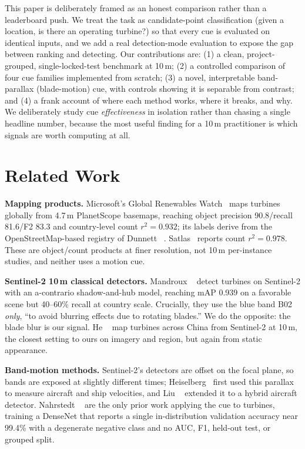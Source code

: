 \documentclass[10pt,twocolumn,letterpaper]{article}
\begin{document}
This paper is deliberately framed as an honest comparison rather than a leaderboard push. We treat the task as candidate-point classification (given a location, is there an operating turbine?) so that every cue is evaluated on identical inputs, and we add a real detection-mode evaluation to expose the gap between ranking and detecting. Our contributions are: (1) a clean, project-grouped, single-locked-test benchmark at 10\,m; (2) a controlled comparison of four cue families implemented from scratch; (3) a novel, interpretable band-parallax (blade-motion) cue, with controls showing it is separable from contrast; and (4) a frank account of where each method works, where it breaks, and why. We deliberately study cue \emph{effectiveness} in isolation rather than chasing a single headline number, because the most useful finding for a 10\,m practitioner is which signals are worth computing at all.

\section{Related Work}
\textbf{Mapping products.} Microsoft's Global Renewables Watch~\cite{grw} maps turbines globally from 4.7\,m PlanetScope basemaps, reaching object precision 90.8/recall 81.6/F2 83.3 and country-level count $r^2{=}0.932$; its labels derive from the OpenStreetMap-based registry of Dunnett \etal~\cite{dunnett}. Satlas~\cite{satlas} reports count $r^2{=}0.978$. These are object/count products at finer resolution, not 10\,m per-instance studies, and neither uses a motion cue.

\textbf{Sentinel-2 10\,m classical detectors.} Mandroux \etal~\cite{mandroux_ipol,mandroux_isprs} detect turbines on Sentinel-2 with an a-contrario shadow-and-hub model, reaching mAP 0.939 on a favorable scene but 40--60\% recall at country scale. Crucially, they use the blue band B02 \emph{only}, ``to avoid blurring effects due to rotating blades.'' We do the opposite: the blade blur is our signal. He \etal~\cite{he2025} map turbines across China from Sentinel-2 at 10\,m, the closest setting to ours on imagery and region, but again from static appearance.

\textbf{Band-motion methods.} Sentinel-2's detectors are offset on the focal plane, so bands are exposed at slightly different times; Heiselberg~\cite{heiselberg} first used this parallax to measure aircraft and ship velocities, and Liu \etal~\cite{liu} extended it to a hybrid aircraft detector. Nahrstedt \etal~\cite{nahrstedt} are the only prior work applying the cue to turbines, training a DenseNet that reports a single in-distribution validation accuracy near 99.4\% with a degenerate negative class and no AUC, F1, held-out test, or grouped split.
\end{document}
